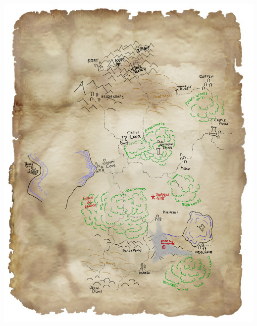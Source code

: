 \clearpage                  %
\begin{samepage}
\null
\thispagestyle{empty}
\vfill
\noindent
\includegraphics[width=0.999\textwidth]{./map/region-eviction-gm.jpg}
\vfill
\end{samepage}




















